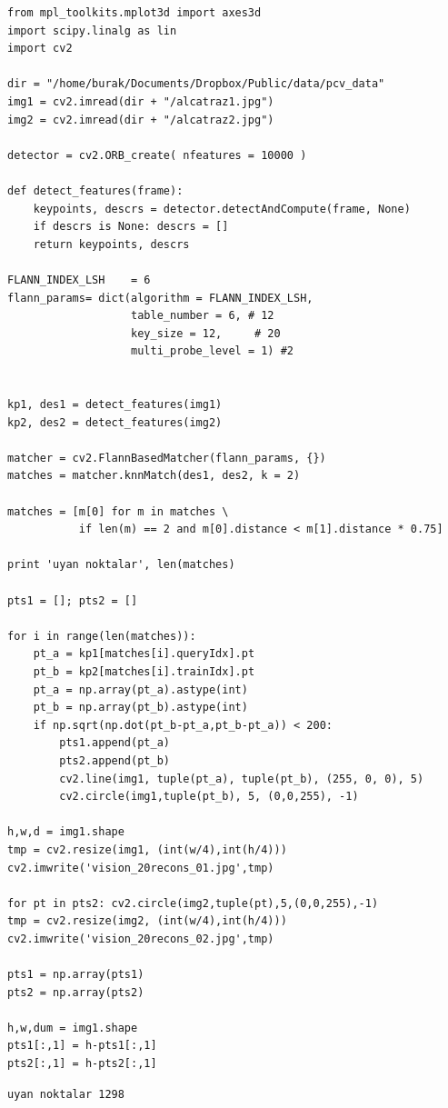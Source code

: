 \documentclass[12pt,fleqn]{article}\usepackage{../../common}
\begin{document}
\begin{verbatim}
from mpl_toolkits.mplot3d import axes3d
import scipy.linalg as lin
import cv2

dir = "/home/burak/Documents/Dropbox/Public/data/pcv_data"
img1 = cv2.imread(dir + "/alcatraz1.jpg")
img2 = cv2.imread(dir + "/alcatraz2.jpg")

detector = cv2.ORB_create( nfeatures = 10000 )

def detect_features(frame):
    keypoints, descrs = detector.detectAndCompute(frame, None)
    if descrs is None: descrs = []
    return keypoints, descrs

FLANN_INDEX_LSH    = 6
flann_params= dict(algorithm = FLANN_INDEX_LSH,
                   table_number = 6, # 12
                   key_size = 12,     # 20
                   multi_probe_level = 1) #2


kp1, des1 = detect_features(img1)
kp2, des2 = detect_features(img2)

matcher = cv2.FlannBasedMatcher(flann_params, {})
matches = matcher.knnMatch(des1, des2, k = 2)

matches = [m[0] for m in matches \
           if len(m) == 2 and m[0].distance < m[1].distance * 0.75]

print 'uyan noktalar', len(matches)

pts1 = []; pts2 = []

for i in range(len(matches)):
    pt_a = kp1[matches[i].queryIdx].pt
    pt_b = kp2[matches[i].trainIdx].pt
    pt_a = np.array(pt_a).astype(int)
    pt_b = np.array(pt_b).astype(int)
    if np.sqrt(np.dot(pt_b-pt_a,pt_b-pt_a)) < 200:
        pts1.append(pt_a)
        pts2.append(pt_b)
        cv2.line(img1, tuple(pt_a), tuple(pt_b), (255, 0, 0), 5)
        cv2.circle(img1,tuple(pt_b), 5, (0,0,255), -1)

h,w,d = img1.shape
tmp = cv2.resize(img1, (int(w/4),int(h/4)))
cv2.imwrite('vision_20recons_01.jpg',tmp)

for pt in pts2: cv2.circle(img2,tuple(pt),5,(0,0,255),-1)
tmp = cv2.resize(img2, (int(w/4),int(h/4)))
cv2.imwrite('vision_20recons_02.jpg',tmp)

pts1 = np.array(pts1)
pts2 = np.array(pts2)

h,w,dum = img1.shape
pts1[:,1] = h-pts1[:,1]
pts2[:,1] = h-pts2[:,1]
\end{verbatim}

\begin{verbatim}
uyan noktalar 1298
\end{verbatim}
\end{document}
